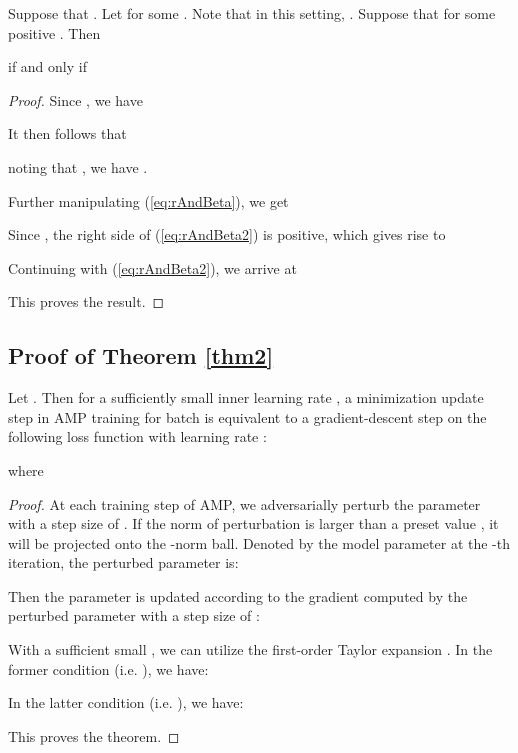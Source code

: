 \documentclass[final]{cvpr}
\newenvironment{innerthm}[1]
  {\renewcommand\theinnercustomthm{#1}\innercustomthm}
  {\endinnercustomthm}
\newenvironment{innercor}[1]
  {\renewcommand\theinnercustomcor{#1}\innercustomcor}
  {\endinnercustomcor}
\begin{document}
\begin{innercor}{2}
Suppose that . Let  for some . Note that in this setting, . Suppose that  for some positive . Then 

if and only if

\end{innercor}

\begin{proof}
Since , we have 


It then follows that

noting that , we have .  

Further manipulating (\ref{eq:rAndBeta}), we get


Since , the right side of (\ref{eq:rAndBeta2}) is positive, which gives rise to 


Continuing with (\ref{eq:rAndBeta2}), we arrive at


This proves the result.
\end{proof}

\subsection{Proof of Theorem \ref{thm2}}\label{app:b}

\begin{innerthm}{2}
Let . Then for a sufficiently small inner learning rate , a minimization update step in AMP training for batch  is equivalent to a gradient-descent step on the following loss function with learning rate :

where

\end{innerthm}

\begin{proof}
At each training step of AMP, we adversarially perturb the parameter with a step size of . If the norm of perturbation is larger than a preset value , it will be projected onto the -norm ball. Denoted by  the model parameter at the -th iteration, the perturbed parameter is:


Then the parameter is updated according to the gradient computed by the perturbed parameter with a step size of :


With a sufficient small , we can utilize the first-order Taylor expansion . In the former condition (i.e. ), we have:


In the latter condition (i.e. ), we have:


This proves the theorem.
\end{proof}
\end{document}

